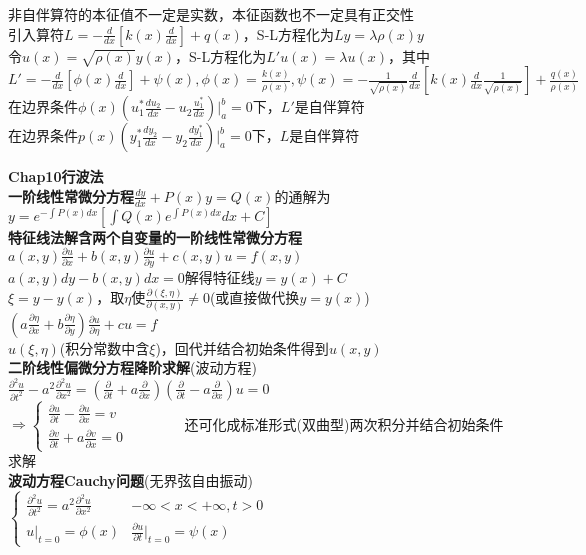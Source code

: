 \documentclass[10pt,a4paper]{article}
\begin{document}
\begin{multicols}{2}
非自伴算符的本征值不一定是实数，本征函数也不一定具有正交性\\
引入算符$L=-\frac{d}{dx}[k(x)\frac{d}{dx}]+q(x)$，S-L方程化为$Ly=\lambda\rho(x)y$\\
令$u(x)=\sqrt{\rho(x)}y(x)$，S-L方程化为$L'u(x)=\lambda u(x)$，其中$L'=-\frac{d}{dx}[\phi(x)\frac{d}{dx}]+\psi(x),\phi(x)=\frac{k(x)}{\rho(x)},\psi(x)=-\frac{1}{\sqrt{\rho(x)}}\frac{d}{dx}[k(x)\frac{d}{dx}\frac{1}{\sqrt{\rho(x)}}]+\frac{q(x)}{\rho(x)}$\\
在边界条件$\phi(x)(u_1^*\frac{du_2}{dx}-u_2\frac{u_1^*}{dx})|_a^b=0$下，$L'$是自伴算符\\
在边界条件$p(x)(y_1^*\frac{dy_2}{dx}-y_2\frac{dy_1^*}{dx})|_a^b=0$下，$L$是自伴算符
\end{multicols}

\begin{multicols}{2}
\textbf{Chap10行波法}\\
\textbf{一阶线性常微分方程}$\frac{dy}{dx}+P(x)y=Q(x)$的通解为$y=e^{-\int P(x)dx}[\int Q(x)e^{\int P(x)dx}dx+C]$\\
\textbf{特征线法解含两个自变量的一阶线性常微分方程}$a(x,y)\frac{\partial u}{\partial x}+b(x,y)\frac{\partial u}{\partial y}+c(x,y)u=f(x,y)$\\
$a(x,y)dy-b(x,y)dx=0$解得特征线$y=y(x)+C$\\
$\xi=y-y(x)$，取$\eta$使$\frac{\partial(\xi,\eta)}{\partial(x,y)}\neq0$(或直接做代换$y=y(x)$)\\
$(a\frac{\partial\eta}{\partial x}+b\frac{\partial\eta}{\partial y})\frac{\partial u}{\partial \eta}+cu=f$\\
$u(\xi,\eta)$(积分常数中含$\xi$)，回代并结合初始条件得到$u(x,y)$\\
\textbf{二阶线性偏微分方程降阶求解}(波动方程)$\frac{\partial^2u}{\partial t^2}-a^2\frac{\partial^2u}{\partial x^2}=(\frac{\partial}{\partial t}+a\frac{\partial}{\partial x})(\frac{\partial}{\partial t}-a\frac{\partial}{\partial x})u=0$\\
\indent$\Longrightarrow\left\{\begin{array}{l}\frac{\partial u}{\partial t}-\frac{\partial u}{\partial x}=v\\\frac{\partial v}{\partial t}+a\frac{\partial v}{\partial x}=0\end{array}\right.$~~~~~~~~还可化成标准形式(双曲型)两次积分并结合初始条件求解\\
\textbf{波动方程Cauchy问题}(无界弦自由振动)$\left\{\begin{array}{ll}\frac{\partial^2u}{\partial t^2}=a^2\frac{\partial^2u}{\partial x^2}&-\infty<x<+\infty,t>0\\u|_{t=0}=\phi(x)&\frac{\partial u}{\partial t}|_{t=0}=\psi(x)\end{array}\right.$\\

\end{multicols}
\end{document}
